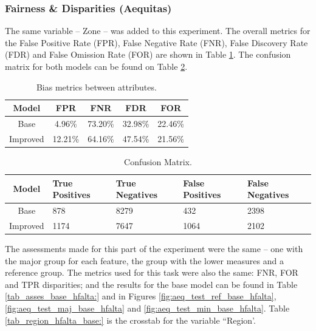 \documentclass[twoside,11pt]{article}
\begin{document}
\subsubsection{Fairness \& Disparities (Aequitas)}

The same variable -- Zone -- was added to this experiment. The overall metrics for the False Positive Rate (FPR), False Negative Rate (FNR), False Discovery Rate (FDR) and False Omission Rate (FOR) are shown in Table \ref{tab_bias_hfalta:}. The confusion matrix for both models can be found on Table \ref{tab_cm_hfalta:}.

\begin{table}[!htb]
\centering
\begin{tabular}{|c|c|c|c|c|}\hline
        \textbf{Model} & \textbf{FPR} & \textbf{FNR} & \textbf{FDR} & \textbf{FOR} \\ \hline
        Base & 4.96\% & 73.20\% & 32.98\% & 22.46\%  \\ 
        Improved & 12.21\% & 64.16\% & 47.54\% & 21.56\% \\ 
        \hline
    \end{tabular}
\caption{Bias metrics between attributes.}
\label{tab_bias_hfalta:}
\end{table}

\begin{table}[!htb]
\centering
\begin{tabular}{|c|p{3cm}|p{3cm}|p{3cm}|p{3cm}|}
        \hline
        \textbf{Model} & \textbf{True Positives} & \textbf{True Negatives} & \textbf{False Positives} & \textbf{False Negatives}\\ \hline
        Base & 878 & 8279 & 432 & 2398  \\ 
        Improved & 1174 & 7647 & 1064 & 2102  \\ 
        \hline
    \end{tabular}
\caption{Confusion Matrix.}
\label{tab_cm_hfalta:}
\end{table}

The assessments made for this part of the experiment were the same -- one with the major group for each feature, the group with the lower measures and a reference group. The metrics used for this task were also the same: FNR, FOR and TPR disparities; and the results for the base model can be found in Table \ref{tab_asses_base_hfalta:} and in Figures \ref{fig:aeq_test_ref_base_hfalta}, \ref{fig:aeq_test_maj_base_hfalta} and \ref{fig:aeq_test_min_base_hfalta}. Table \ref{tab_region_hfalta_base:} is the crosstab for the variable ``Region'.
\end{document}
